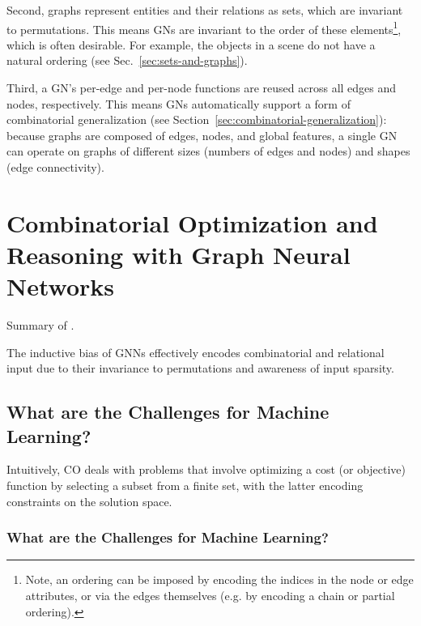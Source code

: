 \documentclass[10pt]{book}
\begin{document}
Second, graphs represent entities and their relations as sets, which are invariant to permutations. This means GNs are invariant to the order of these elements\footnote{Note, an ordering can be imposed by encoding the indices in the node or edge attributes, or via the edges themselves (e.g. by encoding a chain or partial ordering).}, which is often desirable.
For example, the objects in a scene do not have a natural ordering (see Sec.~\ref{sec:sets-and-graphs}).

Third, a GN's per-edge and per-node functions are reused across all edges and nodes, respectively. This means GNs automatically support a form of combinatorial generalization (see Section~\ref{sec:combinatorial-generalization}): because graphs are composed of edges, nodes, and global features, a single GN can operate on graphs of different sizes (numbers of edges and nodes) and shapes (edge connectivity).




\chapter{Combinatorial Optimization and Reasoning with Graph Neural Networks}

Summary of \cite{cappart2021combinatorial}.

The inductive bias of GNNs effectively encodes combinatorial and relational input due to their invariance to permutations and awareness of input sparsity.

\section{What are the Challenges for Machine Learning?}

Intuitively, CO deals with problems that involve optimizing a cost (or objective) function by selecting a subset from a finite set, with the latter encoding constraints on the solution space.

\subsection{What are the Challenges for Machine Learning?}
\end{document}
